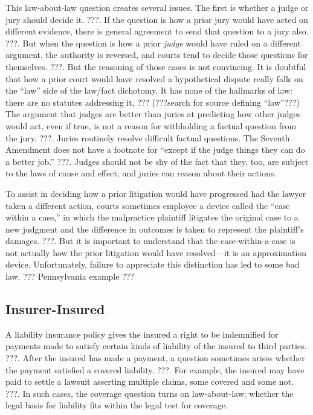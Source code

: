 \documentclass[
  12pt,
  letterpaper,
]{scrartcl}
\begin{document}
This law-about-law question creates several issues. The first is whether a
judge or jury should decide it. ???. If the question is how a prior jury would
have acted on different evidence, there is general agreement to send that
question to a jury also. ???. But when the question is how a prior \emph{judge}
would have ruled on a different argument, the authority is reversed, and courts
tend to decide those questions for themselves. ???. But the reasoning of those
cases is not convincing. It is doubtful that how a prior court would have
resolved a hypothetical dispute really falls on the ``law'' side of the
law/fact dichotomy. It has none of the hallmarks of law: there are no statutes
addressing it, ??? (???search for source defining ``law''???) The argument that
judges are better than juries at predicting how other judges would act, even if
true, is not a reason for withholding a factual question from the jury. ???.
Juries routinely resolve difficult factual questions. The Seventh Amendment
does not have a footnote for ``except if the judge things they can do a better
job.'' ???. Judges should not be shy of the fact that they, too, are subject to
the laws of cause and effect, and juries can reason about their actions.

To assist in deciding how a prior litigation would have progressed had the
lawyer taken a different action, courts sometimes employee a device called the
``case within a case,'' in which the malpractice plaintiff litigates the
original case to a new judgment and the difference in outcomes is taken to
represent the plaintiff's damages. ???. But it is important to understand that
the case-within-a-case is not actually how the prior litigation would have
resolved---it is an approximation device. Unfortunately, failure to appreciate
this distinction has led to some bad law. ??? Pennsylvania example ???

\subsection{Insurer-Insured}

A liability insurance policy gives the insured a right to be indemnified for
payments made to satisfy certain kinds of liability of the insured to third
parties. ???. After the insured has made a payment, a question sometimes arises
whether the payment satisfied a covered liability. ???. For example, the
insured may have paid to settle a lawsuit asserting multiple claims, some
covered and some not. ???. In such cases, the coverage question turns on
law-about-law: whether the legal basis for liability fits within the legal test
for coverage.
\end{document}
